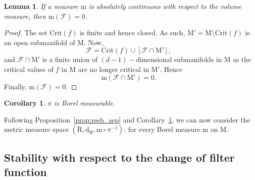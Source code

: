\documentclass[pdflatex,sn-mathphys-ay]{sn-jnl}%
\newtheorem{corollary}{Corollary}[theorem]
\newtheorem{lemma}[theorem]{Lemma}
\newcommand{\reeb}{\mathrm{R}}
\newcommand{\man}{\mathrm{M}}
\newcommand{\mes}{\mathrm{m}}
\newcommand{\critic}{{\mathrm {Crit}}}
\newcommand{\haus}{{\mathrm {d_H}}}
\newcommand{\ball}{{\mathrm {B}}}
\newcommand{\change}[1]{\noindent #1}
\theoremstyle{thmstyleone}%
\begin{document}
\begin{lemma}\label{lem:zero_measure}
If a measure $\mes$ is absolutely continuous with respect to the volume measure, then $\mes(\mathcal{F})=0$.
\end{lemma}
\begin{proof}
The set $\critic(f)$ is finite and hence closed. As such, $\man'=\man\setminus\critic(f)$ is an open submanifold of $\man$. Now,
$$\mathcal{F}=\critic(f)\cup \left[\mathcal{F}\cap \man'\right],$$
and $\mathcal{F}\cap \man'$ is a finite union of $(d-1)-$dimensional submanifolds in $\man$ as the critical values of $f$ in $\man$ are no longer critical in $\man'$. Hence
$$\mes\left( \mathcal{F}\cap \man'\right)=0.$$
Finally, $\mes(\mathcal{F})=0$.
\end{proof}


\begin{corollary}\label{cor:pi_mes}
$\pi$ is Borel measurable.
\end{corollary}

\change{Following Proposition~\ref{prop:reeb_sep} and Corollary~\ref{cor:pi_mes}, we can now consider the metric measure space $(\overline{\reeb},\haus,\mes\circ\pi^{-1})$, for every Borel measure $\mes$ on $\man$.}

\subsection{Stability with respect to the change of filter function}
\end{document}
